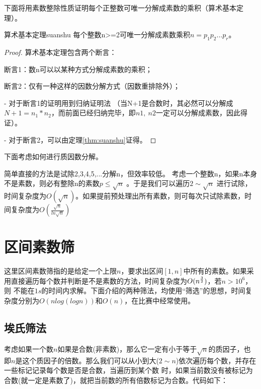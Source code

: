 \vbox{}

下面将用{\heiti 素数整除性质}证明每个正整数可唯一分解成素数的乘积（算术基本定理）。

\begin{theorem}{算术基本定理}{suanshu}
	每个整数n>=2可唯一分解成素数乘积$n=p_1p_2...p_r$。
\end{theorem}

\begin{proof}
算术基本定理包含两个断言：

断言1：数n可以以某种方式分解成素数的乘积；

断言2：仅有一种这样的因数分解方式（因数重排除外）；

- 对于断言1的证明用到归纳证明法 （当N+1是合数时，其必然可以分解成$N+1=n_1*n_2$，而前面已经归纳完毕，即$n1,\ n2$一定可以分解成素数，因此得证）。

- 对于断言2，可以由定理\ref{thm:suanshu}证得。
\end{proof}

\vbox{}

下面考虑如何进行质因数分解。

简单直接的方法是试除2,3,4,5,...分解n，但效率较低。
考虑一个整数n，如果n本身不是素数，则必有整除n的素数$p\leqslant \sqrt{n}$ 。于是我们可以遍历$2\sim \sqrt{n}$
进行试除，时间复杂度为$O(\sqrt{n})$。如果提前预处理出所有素数，则可每次只试除素数，时间复杂度为$O(\frac{\sqrt{n}}{ln \sqrt{n}})$



\section{区间素数筛}

这里区间素数筛指的是给定一个上限$n$，要求出区间$[1,n]$中所有的素数。如果采用直接遍历每个数并判断是不是素数的方法，时间复杂度为$O(n^{3\over2})$，若$n>10^6$，则
不能在$1s$的时间内求解。下面介绍的两种筛法，均使用“筛选”的思想，时间复杂度分别为$O(nlog(logn))$和$O(n)$，在比赛中经常使用。

\subsection{埃氏筛法}
考虑如果一个数$n$如果是合数(非素数)，那么它一定有小于等于$\sqrt{n}$的质因子，也即$n$是这个质因子的倍数。那么我们可以从小到大($2\sim n$)依次遍历每个数，并存在一些标记记录每个数是否是合数，当遍历到某个数
时，如果当前数没有被标记为合数(就一定是素数了)，就把当前数的所有倍数标记为合数。代码如下：

